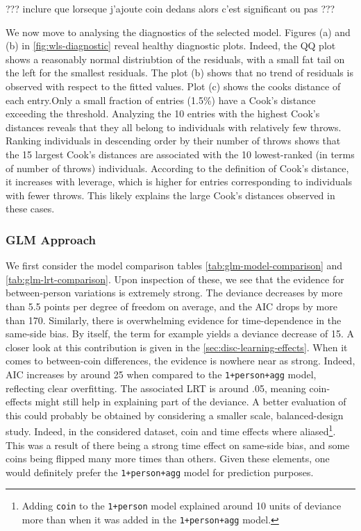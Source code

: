 \documentclass[a4paper, 12pt,oneside]{article}
\begin{document}
		??? inclure que lorseque j'ajoute coin dedans alors c'est significant ou pas ???

		We now move to analysing the diagnostics of the selected model. Figures (a) and (b) in \ref{fig:wls-diagnostic} reveal healthy diagnostic plots. Indeed, the QQ plot shows a reasonably normal distriubtion of the residuals, with a small fat tail on the left for the smallest residuals. The plot (b) shows that no trend of residuals is observed with respect to the fitted values. 
		Plot (c) shows the cooks distance of each entry.Only a small fraction of entries (1.5\%) have a Cook's distance exceeding the threshold. Analyzing the 10 entries with the highest Cook's distances reveals that they all belong to individuals with relatively few throws. Ranking individuals in descending order by their number of throws shows that the 15 largest Cook's distances are associated with the 10 lowest-ranked (in terms of number of throws) individuals. According to the definition of Cook's distance, it increases with leverage, which is higher for entries corresponding to individuals with fewer throws. This likely explains the large Cook's distances observed in these cases.


		\subsubsection{GLM Approach}
			We first consider the model comparison tables \ref{tab:glm-model-comparison} and \ref{tab:glm-lrt-comparison}. 
			Upon inspection of these, we see that the evidence for between-person variations is extremely strong. The deviance decreases by more than 5.5 points per degree of freedom on average, and the AIC drops by more than 170. Similarly, there is overwhelming evidence for time-dependence in the same-side bias. By itself, the term for example yields a deviance decrease of 15. A closer look at this contribution is given in the \ref{sec:disc-learning-effects}. When it comes to between-coin differences, the evidence is nowhere near as strong. Indeed, AIC increases by around 25 when compared to the \texttt{1+person+agg} model, reflecting clear overfitting. The associated LRT is around .05, meaning coin-effects might still help in explaining part of the deviance. A better evaluation of this could probably be obtained by considering a smaller scale, balanced-design study. Indeed, in the considered dataset, coin and time effects where aliased\footnote{Adding \texttt{coin} to the \texttt{1+person} model explained around 10 units of deviance more than when it was added in the \texttt{1+person+agg} model.}. This was a result of there being a strong time effect on same-side bias, and some coins being flipped many more times than others. 
			Given these elements, one would definitely prefer the \texttt{1+person+agg} model for prediction purposes.  
\end{document}
